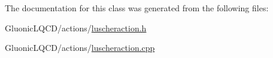 The documentation for this class was generated from the following files\+:\begin{DoxyCompactItemize}
\item 
Gluonic\+L\+Q\+C\+D/actions/\mbox{\hyperlink{luscheraction_8h}{luscheraction.\+h}}\item 
Gluonic\+L\+Q\+C\+D/actions/\mbox{\hyperlink{luscheraction_8cpp}{luscheraction.\+cpp}}\end{DoxyCompactItemize}
